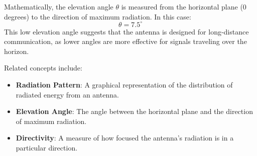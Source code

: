 Mathematically, the elevation angle \(\theta\) is measured from the horizontal plane (0 degrees) to the direction of maximum radiation. In this case:
\[
\theta = 7.5^\circ
\]
This low elevation angle suggests that the antenna is designed for long-distance communication, as lower angles are more effective for signals traveling over the horizon.

Related concepts include:
\begin{itemize}
    \item \textbf{Radiation Pattern}: A graphical representation of the distribution of radiated energy from an antenna.
    \item \textbf{Elevation Angle}: The angle between the horizontal plane and the direction of maximum radiation.
    \item \textbf{Directivity}: A measure of how focused the antenna’s radiation is in a particular direction.
\end{itemize}

